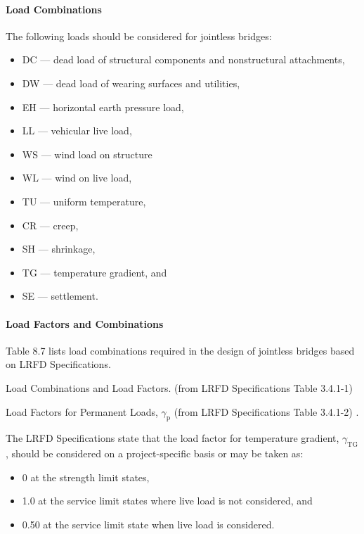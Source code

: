 \paragraph{Load Combinations}
The following loads should be considered for jointless bridges:
\begin{itemize}
  \item  DC — dead load of structural components and nonstructural attachments,
  \item  DW — dead load of wearing surfaces and utilities,
  \item  EH — horizontal earth pressure load,
  \item  LL — vehicular live load,
  \item  WS — wind load on structure
  \item  WL — wind on live load,
  \item  TU — uniform temperature,
  \item  CR — creep,
  \item  SH — shrinkage,
  \item  TG — temperature gradient, and
  \item  SE — settlement.
\end{itemize}


\paragraph{Load Factors and Combinations}

Table 8.7 lists load combinations required in the design of jointless bridges based on LRFD Specifications.
\begin{table}
  \caption{Load Combinations and Load Factors. (from LRFD Specifications Table 3.4.1-1)}
  \label{tab:load-combinations-load-factors}
\end{table}

\begin{table}
  \caption{Load Factors for Permanent Loads, $\gamma_\text{p}$ (from LRFD Specifications Table 3.4.1-2)
  .}
  \label{tab:load-factors-permanent}
\end{table}

The LRFD Specifications state that the load factor for temperature gradient, $\gamma_\text{TG}$, should be considered on a project-specific basis or may be taken as:

\begin{itemize}
  \item 0 at the strength limit states,
  \item 1.0 at the service limit states where live load is not considered, and
  \item 0.50 at the service limit state when live load is considered.
\end{itemize}

